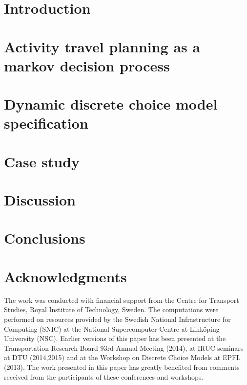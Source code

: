 \documentclass[final,pdftex]{Oskarthesis}
\numberwithin{equation}{section}
\begin{document}
\section{Introduction}

%
\section{Activity travel planning as a markov decision process}\label{seq:model}

\section{Dynamic discrete choice model specification}

\section{Case study}

\FloatBarrier

\section{Discussion}

\section{Conclusions}


\section*{Acknowledgments}
The work was conducted with financial support from the Centre for Transport Studies, Royal Institute of Technology, Sweden. The computations were performed on resources provided by the Swedish National Infrastructure for Computing (SNIC) at the National Supercomputer Centre at Link\"oping University (NSC). Earlier versions of this paper has been presented at the Transportation Research Board 93rd Annual Meeting (2014), at IRUC seminars at DTU (2014,2015) and at the Workshop on Discrete Choice Models at EPFL (2013). The work presented in this paper has greatly benefited from comments received from the participants of these conferences and workshops.

\footnotesize


%

%
\end{document}
